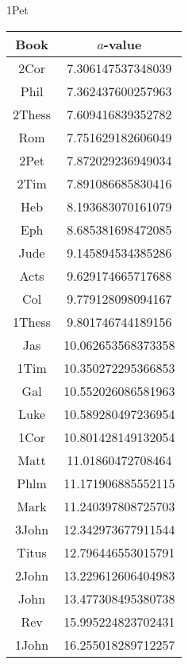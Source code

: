 \documentclass[12pt,letterpaper]{article}
\begin{document}
1Pet
\begin{longtable}{|c|c|}
\hline
 Book & $a$-value \\ \hline
2Cor & 7.306147537348039 \\ \hline
 Phil & 7.362437600257963 \\ \hline
 2Thess & 7.609416839352782 \\ \hline
 Rom & 7.751629182606049 \\ \hline
 2Pet & 7.872029236949034 \\ \hline
 2Tim & 7.891086685830416 \\ \hline
 Heb & 8.193683070161079 \\ \hline
 Eph & 8.685381698472085 \\ \hline
 Jude & 9.145894534385286 \\ \hline
 Acts & 9.629174665717688 \\ \hline
 Col & 9.779128098094167 \\ \hline
 1Thess & 9.801746744189156 \\ \hline
 Jas & 10.062653568373358 \\ \hline
 1Tim & 10.350272295366853 \\ \hline
 Gal & 10.552026086581963 \\ \hline
 Luke & 10.589280497236954 \\ \hline
 1Cor & 10.801428149132054 \\ \hline
 Matt & 11.01860472708464 \\ \hline
 Phlm & 11.171906885552115 \\ \hline
 Mark & 11.240397808725703 \\ \hline
 3John & 12.342973677911544 \\ \hline
 Titus & 12.796446553015791 \\ \hline
 2John & 13.229612606404983 \\ \hline
 John & 13.477308495380738 \\ \hline
 Rev & 15.995224823702431 \\ \hline
 1John & 16.255018289712257 \\ \hline 
\end{longtable}
\end{document}
